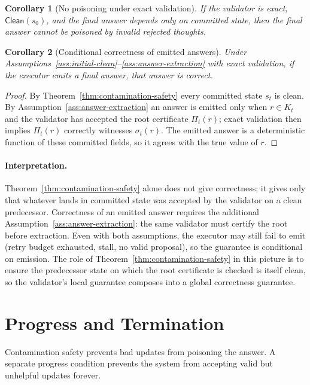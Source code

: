 \documentclass[11pt]{article}
\newtheorem{corollary}{Corollary}
\newcommand{\Clean}{\mathsf{Clean}}
\begin{document}
\begin{corollary}[No poisoning under exact validation]
If the validator is exact, $\Clean(s_0)$, and the final answer depends only on
committed state, then the final answer cannot be poisoned by invalid rejected
thoughts.
\end{corollary}

\begin{corollary}[Conditional correctness of emitted answers]
\label{cor:conditional-correctness}
Under Assumptions~\ref{ass:initial-clean}--\ref{ass:answer-extraction} with exact validation, if the
executor emits a final answer, that answer is correct.
\end{corollary}

\begin{proof}
By Theorem~\ref{thm:contamination-safety} every committed state $s_t$ is clean. By
Assumption~\ref{ass:answer-extraction} an answer is emitted only when
$r\in K_t$ and the validator has accepted the root certificate $\Pi_t(r)$;
exact validation then implies $\Pi_t(r)$ correctly witnesses $\sigma_t(r)$.
The emitted answer is a deterministic function of these committed fields, so
it agrees with the true value of $r$.
\end{proof}

\paragraph{Interpretation.}
Theorem~\ref{thm:contamination-safety} alone does not give correctness; it gives only that whatever lands
in committed state was accepted by the validator on a clean predecessor.
Correctness of an emitted answer requires the additional
Assumption~\ref{ass:answer-extraction}: the same validator must certify the
root before extraction. Even with both assumptions, the executor may still
fail to emit (retry budget exhausted, stall, no valid proposal), so the
guarantee is conditional on emission. The role of Theorem~\ref{thm:contamination-safety} in this picture
is to ensure the predecessor state on which the root certificate is checked
is itself clean, so the validator's local guarantee composes into a global
correctness guarantee.

\section{Progress and Termination}

Contamination safety prevents bad updates from poisoning the answer. A separate
progress condition prevents the system from accepting valid but unhelpful
updates forever.
\end{document}

